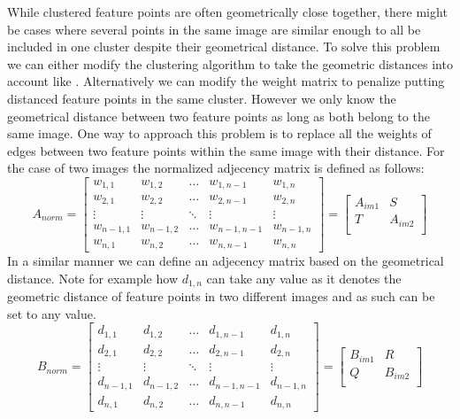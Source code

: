 \documentclass{article}
\begin{document}
While clustered feature points are often geometrically close together, 
there might be cases where several points in the same image are similar 
enough to all be included in one cluster despite their geometrical 
distance.  To solve this problem we can either modify the clustering 
algorithm to take the geometric distances into account like 
\cite{das2008event}.  Alternatively we can modify the weight matrix to 
penalize putting distanced feature points in the same cluster. However 
we only know the geometrical distance between two feature points as long 
as both belong to the same image. One way to approach this problem is to 
replace all the weights of edges between two feature points within the 
same image with their distance. For the case of two images the 
normalized adjecency matrix is defined as follows:
%
$$A_{norm}=
\begin{bmatrix}
w_{1,1}   & w_{1,2}   & \ldots & w_{1,n-1}   & w_{1,n}     \\
w_{2,1}   & w_{2,2}   & \ldots & w_{2,n-1}   & w_{2,n}     \\
\vdots    & \vdots    & \ddots & \vdots      & \vdots      \\
w_{n-1,1} & w_{n-1,2} & \ldots & w_{n-1,n-1} & w_{n-1,n}   \\
w_{n,1}   & w_{n,2}   & \ldots & w_{n,n-1}   & w_{n,n}
\end{bmatrix}=
\begin{bmatrix}
A_{im1} & S       \\
T       & A_{im2} \\
\end{bmatrix}
$$
%
In a similar manner we can define an adjecency matrix based on the 
geometrical distance. Note for example how $d_{1,n}$ can take any value 
as it denotes the geometric distance of feature points in two different 
images and as such can be set to any value.
%
$$B_{norm}=
\begin{bmatrix}
d_{1,1}   & d_{1,2}   & \ldots & d_{1,n-1}   & d_{1,n}     \\
d_{2,1}   & d_{2,2}   & \ldots & d_{2,n-1}   & d_{2,n}     \\
\vdots    & \vdots    & \ddots & \vdots      & \vdots      \\
d_{n-1,1} & d_{n-1,2} & \ldots & d_{n-1,n-1} & d_{n-1,n}   \\
d_{n,1}   & d_{n,2}   & \ldots & d_{n,n-1}   & d_{n,n}
\end{bmatrix}=
\begin{bmatrix}
B_{im1} & R       \\
Q       & B_{im2} \\
\end{bmatrix}
$$
\end{document}
